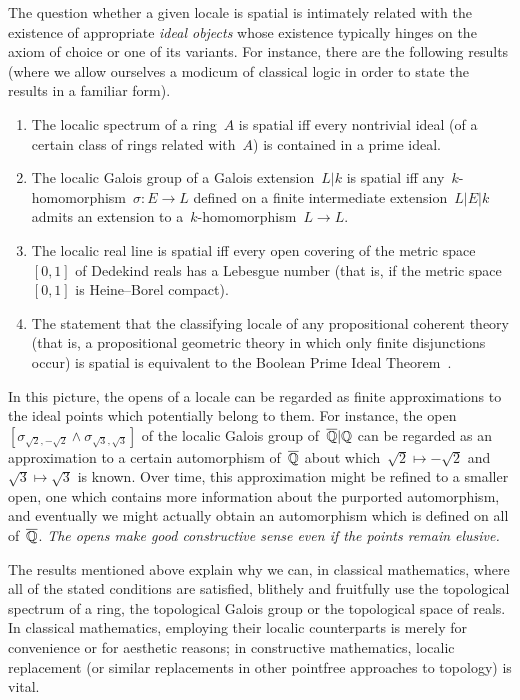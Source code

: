 \documentclass{ws-rv9x6}
\begin{document}
{The question whether a given locale is spatial is intimately related with the
existence of appropriate \emph{ideal objects} whose existence typically hinges
on the axiom of choice or one of its variants. For instance, there are the
following results (where we allow ourselves a modicum of classical logic in
order to state the results in a familiar form).
\begin{enumerate}
\item The localic spectrum of a ring~$A$ is spatial iff every nontrivial ideal
(of a certain class of rings related with~$A$) is contained in a prime ideal.
\item The localic Galois group of a Galois extension~$L|k$ is spatial iff
any~$k$-homomorphism~$\sigma : E \to L$ defined on a finite intermediate
extension~$L|E|k$ admits an extension to a~$k$-homomorphism~$L \to L$.
\item The localic real line is spatial iff every open covering of the
metric space~$[0,1]$ of Dedekind reals has a Lebesgue number (that is, if the
metric space~$[0,1]$ is Heine--Borel compact).
\item The statement that the classifying locale of any propositional coherent
theory (that is, a propositional geometric theory in which only finite
disjunctions occur) is spatial is equivalent to the Boolean Prime Ideal
Theorem~\BPIT.
\end{enumerate}

In this picture, the opens of a locale can be regarded as finite approximations
to the ideal points which potentially belong to them. For instance, the
open~$[\sigma_{\sqrt{2},-\sqrt{2}} \wedge \sigma_{\sqrt{3},\sqrt{3}}]$
of the localic Galois group of~$\overline{\mathbb{Q}}|\mathbb{Q}$ can be regarded as an
approximation to a certain automorphism of~$\overline{\mathbb{Q}}$ about
which~$\sqrt{2} \mapsto -\sqrt{2}$ and~$\sqrt{3} \mapsto \sqrt{3}$ is known. Over time, this
approximation might be refined to a smaller open, one which contains more
information about the purported automorphism, and eventually we might actually
obtain an automorphism which is defined on all of~$\overline{\mathbb{Q}}$. \emph{The opens
make good constructive sense even if the points remain elusive.}

The results mentioned above explain why we can, in classical mathematics, where all of the stated
conditions are satisfied, blithely and fruitfully use the topological
spectrum of a ring, the topological Galois group or the topological space of
reals. In classical mathematics, employing their localic counterparts is merely
for convenience or for aesthetic reasons; in constructive mathematics,
localic replacement (or similar replacements in other pointfree approaches to
topology) is vital.

}
\end{document}
